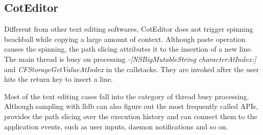 \subsection{CotEditor}

Different from other text editing softwares, CotEditor does not trigger spinning
beachball while copying a large amount of context. Although paste operation
causes the spinning, the path slicing attributes it to the insertion of a
new line. The main thread is busy on processing \textit{-[NSBigMutableString
characterAtIndex:]} and \textit{CFStorageGetValueAtIndex} in the callstacks.
They are invoked after the user hits the return key to insert a line.

Most of the text editing cases fall into the category of thread busy processing.
Although sampling with lldb can also figure out the most frequently called APIs,
\xxx provides the path slicing over the execution history and can connect them
to the application events, such as user inputs, daemon notifications and so on.
